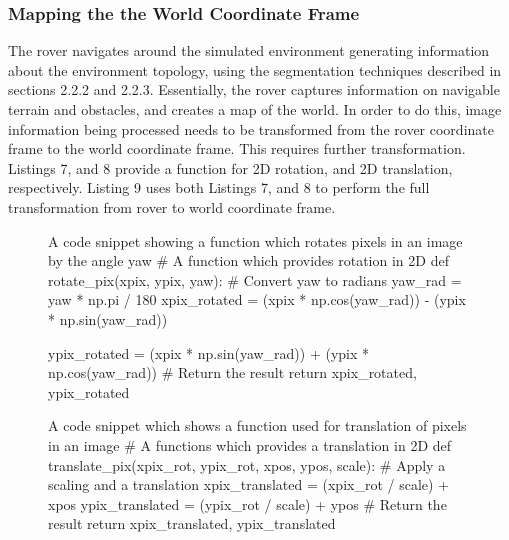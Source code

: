 \documentclass[a4paper]{article}
\begin{document}
\subsubsection{Mapping the the World Coordinate Frame}

The rover navigates around the simulated environment generating information about the environment topology, using the segmentation techniques described in sections 2.2.2 and 2.2.3. Essentially, the rover captures information on navigable terrain and obstacles, and creates a map of the world. In order to do this, image information being processed needs to be transformed from the rover coordinate frame to the world coordinate frame. This requires further transformation. Listings 7, and 8 provide a function for 2D rotation, and 2D translation, respectively. Listing 9 uses both Listings 7, and 8 to perform the full transformation from rover to world coordinate frame.

\vspace{1cm}

\begin{figure}[h]\scriptsize
\begin{sexylisting}{A code snippet showing a function which rotates pixels in an image by the angle yaw}
# A function which provides rotation in 2D
def rotate_pix(xpix, ypix, yaw):
    # Convert yaw to radians
    yaw_rad = yaw * np.pi / 180
    xpix_rotated = (xpix * np.cos(yaw_rad)) - (ypix * np.sin(yaw_rad))
                            
    ypix_rotated = (xpix * np.sin(yaw_rad)) + (ypix * np.cos(yaw_rad))
    # Return the result  
    return xpix_rotated, ypix_rotated
\end{sexylisting}
\end{figure}

\begin{figure}[h]\scriptsize
\begin{sexylisting}{A code snippet which shows a function used for translation of pixels in an image}
# A functions which provides a translation in 2D
def translate_pix(xpix_rot, ypix_rot, xpos, ypos, scale): 
    # Apply a scaling and a translation
    xpix_translated = (xpix_rot / scale) + xpos
    ypix_translated = (ypix_rot / scale) + ypos
    # Return the result  
    return xpix_translated, ypix_translated
\end{sexylisting}
\end{figure}
\end{document}
